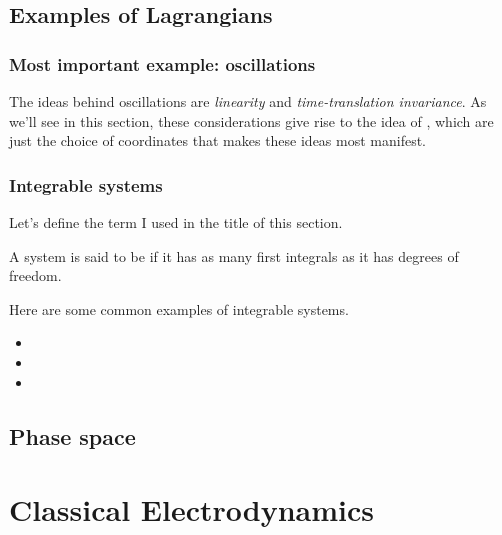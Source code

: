 \documentclass[11pt]{article}
\begin{document}
\subsection{Examples of Lagrangians}

\subsubsection{Most important example: oscillations}

The ideas behind oscillations are \emph{linearity}
and \emph{time-translation invariance}. As we'll
see in this section, these considerations give rise
to the idea of , which are just the
choice of coordinates that makes these ideas most manifest.

\subsubsection{Integrable systems}

Let's define the term I used in the title of this section.

\begin{ddefinition}
    [Integrability]
    A system is said to be  if it has as
    many first integrals as it has degrees of freedom.
\end{ddefinition}

\begin{eexample}
    Here are some common examples of integrable systems.
    \begin{itemize}
        \item {}
        \item {}
        \item {}
    \end{itemize}
\end{eexample}


\subsection{Phase space}


\newpage

\section{Classical Electrodynamics}
\end{document}
